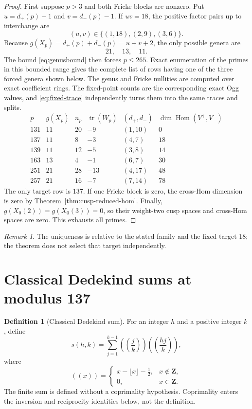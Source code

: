 \documentclass[11pt]{article}
\theoremstyle{definition}
\newtheorem{definition}[theorem]{Definition}
\theoremstyle{remark}
\newtheorem{remark}[theorem]{Remark}
\newcommand{\Z}{\mathbf{Z}}
\DeclareMathOperator{\Hom}{Hom}
\DeclareMathOperator{\tr}{tr}
\begin{document}
\begin{proof}
First suppose $p>3$ and both Fricke blocks are nonzero.  Put
$u=d_+(p)-1$ and $v=d_-(p)-1$.  If $uv=18$, the positive factor pairs up to
interchange are
\[
  (u,v)\in\{(1,18),(2,9),(3,6)\}.
\]
Because $g(X_p)=d_+(p)+d_-(p)=u+v+2$, the only possible genera are
\[
  21,\quad 13,\quad 11.
\]
The bound \eqref{eq:genusbound} then forces $p\leq265$.  Exact enumeration of
the primes in this bounded range gives the complete list of rows having one of
the three forced genera shown below.  The genus and Fricke nullities are
computed over exact coefficient rings.
The fixed-point counts are the corresponding exact Ogg values, and
\eqref{eq:fixed-trace} independently turns them into the same traces and
splits.
\[
\begin{array}{c|c|c|c|c|c}
  p & g(X_p) & n_p & \tr(W_p) & (d_+,d_-) & \dim\Hom(V^+,V^-)\\
  \hline
  131 & 11 & 20 & -9  & (1,10) & 0\\
  137 & 11 & 8  & -3  & (4,7)  & 18\\
  139 & 11 & 12 & -5  & (3,8)  & 14\\
  163 & 13 & 4  & -1  & (6,7)  & 30\\
  251 & 21 & 28 & -13 & (4,17) & 48\\
  257 & 21 & 16 & -7  & (7,14) & 78
\end{array}
\]
The only target row is $137$.  If one Fricke block is zero, the cross-Hom
dimension is zero by Theorem~\ref{thm:cusp-reduced-hom}.  Finally,
$g(X_0(2))=g(X_0(3))=0$, so their weight-two cusp spaces and cross-Hom spaces
are zero.  This exhausts all primes.
\end{proof}

\begin{remark}
The uniqueness is relative to the stated family and the fixed target $18$;
the theorem does not select that target independently.
\end{remark}

\section{Classical Dedekind sums at modulus 137}\label{sec:classical-dedekind}

\begin{definition}[Classical Dedekind sum]\label{def:classical-dedekind-sum}
For an integer $h$ and a positive integer $k$, define
\[
  s(h,k)=\sum_{j=1}^{k-1}
  \left(\!\left(\frac{j}{k}\right)\!\right)
  \left(\!\left(\frac{hj}{k}\right)\!\right),
\]
where
\[
  ((x))=
  \begin{cases}
    x-\lfloor x\rfloor-\frac12,&x\notin\Z,\\
    0,&x\in\Z.
  \end{cases}
\]
The finite sum is defined without a coprimality hypothesis.  Coprimality enters
the inversion and reciprocity identities below, not the definition.
\end{definition}
\end{document}
